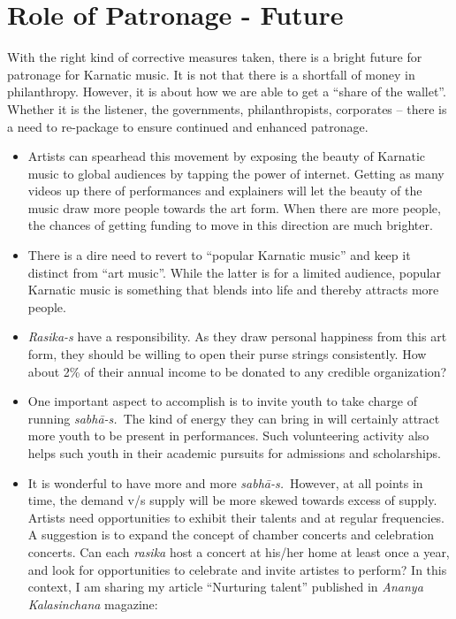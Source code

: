 \vspace{-.6cm}

\section*{Role of Patronage - Future}

With the right kind of corrective measures taken, there is a bright future for patronage for Karnatic music. It is not that there is a shortfall of money in philanthropy. However, it is about how we are able to get a “share of the wallet”. Whether it is the listener, the governments, philanthropists, corporates – there is a need to re-package to ensure continued and enhanced patronage.

\begin{itemize}
\itemsep=0pt

 \item Artists can spearhead this movement by exposing the beauty of Karnatic music to global audiences by tapping the power of internet. Getting as many videos up there of performances and explainers will let the beauty of the music draw more people towards the art form. When there are more people, the chances of getting funding to move in this direction are much brighter.

 \item There is a dire need to revert to “popular Karnatic music” and keep it distinct from “art music”. While the latter is for a limited audience, popular Karnatic music is something that blends into life and thereby attracts more people.

 \item \textit{Rasika-s} have a responsibility. As they draw personal happiness from this art form, they should be willing to open their purse strings consistently. How about 2\% of their annual income to be donated to any credible organization?

 \item One important aspect to accomplish is to invite youth to take charge of running \textit{sabhā-s.}~The kind of energy they can bring in will certainly attract more youth to be present in performances. Such volunteering activity also helps such youth in their academic pursuits for admissions and scholarships.

 \item 
 It is wonderful to have more and more \textit{sabhā-s.}~However, at all points in time, the demand v/s supply will be more skewed towards excess of supply. Artists need opportunities to exhibit their talents and at regular frequencies. A suggestion is to expand the concept of chamber concerts and celebration concerts. Can each \textit{rasika} host a concert at his/her home at least once a year, and look for opportunities to celebrate and invite artistes to perform? In this context, I am sharing my article “Nurturing talent” published in \textit{Ananya Kalasinchana} magazine:


\end{itemize}
